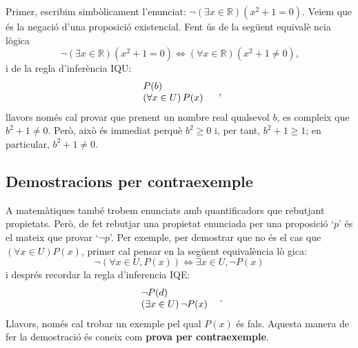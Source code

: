 \begin{solucio}
Primer, escribim simb\`{o}licament l'enunciat: $\lnot\left( \exists x\in%
\mathbb{R}\right) \left( x^{2}+1=0\right) $. Veiem que \'{e}s la negaci\'{o}
d'una proposici\'{o} existencial. Fent \'{u}s de la seg\"{u}ent equival\`{e}%
ncia l\`{o}gica%
\begin{equation*}
\lnot\left( \exists x\in\mathbb{R}\right) \left( x^{2}+1=0\right)
\Longleftrightarrow\left( \forall x\in\mathbb{R}\right) \left(
x^{2}+1\neq0\right) \text{,}
\end{equation*}
i de la regla d'infer\`{e}ncia IQU:%
\begin{equation*}
\begin{tabular}{l}
$P(b)$ \\
$\left( \forall x\in U\right) P(x)$%
\end{tabular}
\ \text{,}
\end{equation*}
llavors nom\'{e}s cal provar que prenent un nombre real qualsevol $b$, es
compleix que $b^{2}+1\neq0$. Per\`{o}, aix\`{o} \'{e}s immediat perqu\`{e} $%
b^{2}\geq0$ i, per tant, $b^{2}+1\geq1$; en particular, $b^{2}+1\neq0$.
\end{solucio}

\subsection{Demostracions per contraexemple}

A matem\`{a}tiques tamb\'{e} trobem enunciats amb quantificadors que
rebutjant propietats. Per\`{o}, de fet rebutjar una propietat enunciada per
una proposici\'{o} `$p$' \'{e}s el mateix que provar `$\lnot p$'. Per
exemple, per demostrar que no \'{e}s el cas que $\left( \forall x\in
U\right) P(x)$, primer cal pensar en la seg\"{u}ent equival\`{e}ncia l\`{o}%
gica:%
\begin{equation*}
\lnot\left( \forall x\in U,P(x)\right) \Longleftrightarrow\exists x\in
U,\lnot P\left( x\right)
\end{equation*}
i despr\'{e}s recordar la regla d'inferencia IQE:%
\begin{equation*}
\begin{tabular}{l}
$\lnot P(d)$ \\
$\left( \exists x\in U\right) \lnot P(x)$%
\end{tabular}
\text{.}
\end{equation*}
Llavors, nom\'{e}s cal trobar un exemple pel qual $P(x)$ \'{e}s fals.
Aquesta manera de fer la demostraci\'{o} \'{e}s coneix com \textbf{prova per
contraexemple}.


